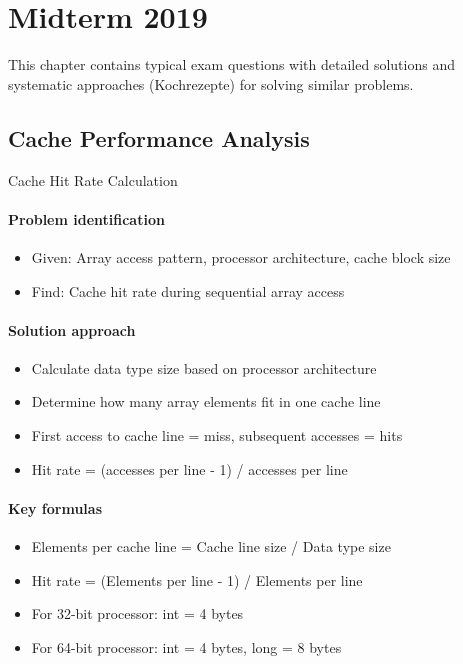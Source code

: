 \section{Midterm 2019} 

This chapter contains typical exam questions with detailed solutions and systematic approaches (Kochrezepte) for solving similar problems.

\subsection{Cache Performance Analysis}

\begin{KR}{Cache Hit Rate Calculation}
    \paragraph{Problem identification}
    \begin{itemize}
        \item Given: Array access pattern, processor architecture, cache block size
        \item Find: Cache hit rate during sequential array access
    \end{itemize}
    
    \paragraph{Solution approach}
    \begin{itemize}
        \item Calculate data type size based on processor architecture
        \item Determine how many array elements fit in one cache line
        \item First access to cache line = miss, subsequent accesses = hits
        \item Hit rate = (accesses per line - 1) / accesses per line
    \end{itemize}
    
    \paragraph{Key formulas}
    \begin{itemize}
        \item Elements per cache line = Cache line size / Data type size
        \item Hit rate = (Elements per line - 1) / Elements per line
        \item For 32-bit processor: int = 4 bytes
        \item For 64-bit processor: int = 4 bytes, long = 8 bytes
    \end{itemize}
\end{KR}


